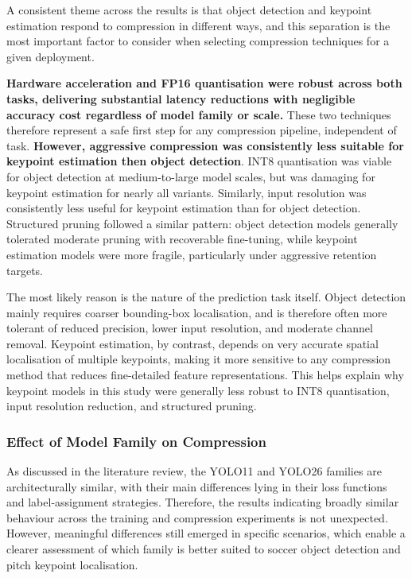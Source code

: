 A consistent theme across the results is that object detection and keypoint estimation respond to compression in different ways, and this separation is the most important factor to consider when selecting compression techniques for a given deployment. 

\textbf{Hardware acceleration and FP16 quantisation were robust across both tasks, delivering substantial latency reductions with negligible accuracy cost regardless of model family or scale.} These two techniques therefore represent a safe first step for any compression pipeline, independent of task. \textbf{However, aggressive compression was consistently less suitable for keypoint estimation then object detection}. INT8 quantisation was viable for object detection at medium-to-large model scales, but was damaging for keypoint estimation for nearly all variants. Similarly, input resolution was consistently less useful for keypoint estimation than for object detection. Structured pruning followed a similar pattern: object detection models generally tolerated moderate pruning with recoverable fine-tuning, while keypoint estimation models were more fragile, particularly under aggressive retention targets.

The most likely reason is the nature of the prediction task itself. Object detection mainly requires coarser bounding-box localisation, and is therefore often more tolerant of reduced precision, lower input resolution, and moderate channel removal. Keypoint estimation, by contrast, depends on very accurate spatial localisation of multiple keypoints, making it more sensitive to any compression method that reduces fine-detailed feature representations. This helps explain why keypoint models in this study were generally less robust to INT8 quantisation, input resolution reduction, and structured pruning.


\subsubsection{Effect of Model Family on Compression}

As discussed in the literature review, the YOLO11 and YOLO26 families are architecturally similar, with their main differences lying in their loss functions and label-assignment strategies. Therefore, the results indicating broadly similar behaviour across the training and compression experiments is not unexpected. However, meaningful differences still emerged in specific scenarios, which enable a clearer assessment of which family is better suited to soccer object detection and pitch keypoint localisation.


